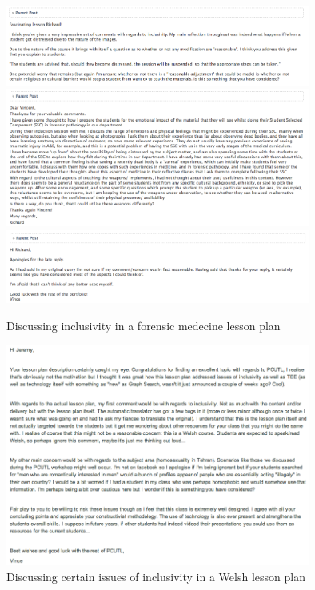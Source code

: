 \documentclass[a4paper,12pt]{article}
\begin{document}
\begin{figure}[htdp]
    \begin{center}
        \includegraphics[width=10cm]{./images/chat_with_richard-a}
        \includegraphics[width=10cm]{./images/chat_with_richard-b}
        \includegraphics[width=10cm]{./images/chat_with_richard-c}
    \end{center}
    \caption{Discussing inclusivity in a forensic medecine lesson plan}
    \label{chat_with_richard}
\end{figure}

\begin{figure}[htdp]
    \begin{center}
        \includegraphics[width=10cm]{./images/chat_about_jeremys_M2_lesson_plan}
    \end{center}
    \caption{Discussing certain issues of inclusivity in a Welsh lesson plan}
    \label{chat_about_jeremys_M2_lesson_plan}
\end{figure}
\end{document}

